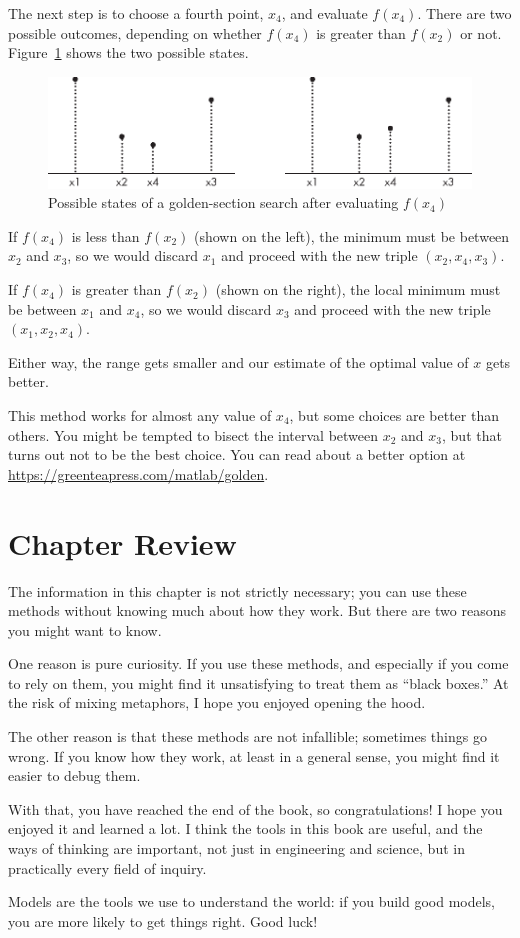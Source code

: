 
The next step is to choose a fourth point, $x_4$, and evaluate
$f(x_4)$.  There are two possible outcomes, depending on whether
$f(x_4)$ is greater than $f(x_2)$ or not.
Figure~\ref{fig:golden2} shows the two possible states.

\begin{figure}[h]
\includegraphics{images/figure15_05_new.eps}
\caption{Possible states of a golden-section search after evaluating $f(x_4)$}
\label{fig:golden2}
\end{figure}

If $f(x_4)$ is less than $f(x_2)$ (shown on the left), the
minimum must be between $x_2$ and $x_3$, so we would discard $x_1$ and proceed with the new triple $(x_2, x_4, x_3)$.

If $f(x_4)$ is greater than $f(x_2)$ (shown on the right), the
local minimum must be between $x_1$ and $x_4$, so we would discard $x_3$ and proceed with the new triple $(x_1, x_2, x_4)$.

Either way, the range gets smaller and our estimate of the optimal value of $x$ gets better.

This method works for almost any value of $x_4$, but some choices
are better than others.  You might be tempted to bisect the interval between $x_2$ and $x_3$, but that turns out not to be the best choice.  You can read about a better option at \url{https://greenteapress.com/matlab/golden}.

\section{Chapter Review}

The information in this chapter is not strictly necessary; you can use these methods without knowing much about how they work.  But there are two reasons you might want to know.

One reason is pure curiosity.  If you use these methods, and especially if you come to rely on them, you might find it unsatisfying to treat them as ``black boxes.''  At the risk of mixing metaphors, I hope you enjoyed opening the hood.

The other reason is that these methods are not infallible; sometimes things go wrong.  If you know how they work, at least in a general sense, you might find it easier to debug them.

With that, you have reached the end of the book, so congratulations!  I hope you enjoyed it and learned a lot.  I think the tools in this book are useful, and the ways of thinking are important, not just in engineering and science, but in practically every field of inquiry.

Models are the tools we use to understand the world: if you build good models, you are more likely to get things right.  Good luck!

